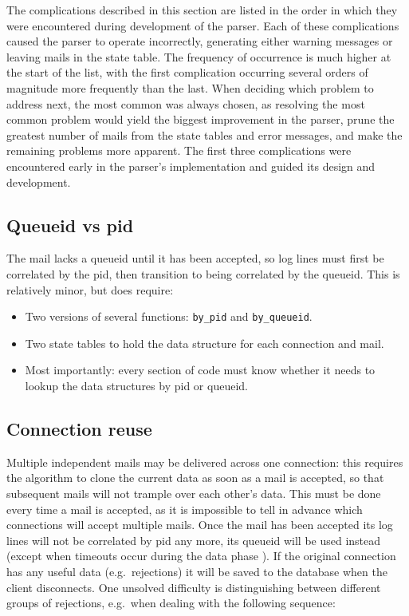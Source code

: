 The complications described in this section are listed in the order in
which they were encountered during development of the parser.  Each of
these complications caused the parser to operate incorrectly, generating
either warning messages or leaving mails in the state table.  The frequency
of occurrence is much higher at the start of the list, with the first
complication occurring several orders of magnitude more frequently than the
last.  When deciding which problem to address next, the most common was
always chosen, as resolving the most common problem would yield the biggest
improvement in the parser, prune the greatest number of mails from the
state tables and error messages, and make the remaining problems more
apparent.  The first three complications were encountered early in the
parser's implementation and guided its design and development.

\subsection{Queueid vs pid}

The mail lacks a queueid until it has been accepted, so log lines must
first be correlated by the  \gls{pid}, then transition to
being correlated by the queueid.  This is relatively minor, but does
require:

\begin{itemize}

    \item Two versions of several functions: \texttt{by\_pid} and
        \texttt{by\_queueid}.

    \item Two state tables to hold the data structure for each connection
        and mail.

    \item Most importantly: every section of code must know whether it
        needs to lookup the data structures by \gls{pid} or queueid.

\end{itemize}

\subsection{Connection reuse}

\label{connection reuse}

Multiple independent mails may be delivered across one connection: this
requires the algorithm to clone the current data as soon as a mail is
accepted, so that subsequent mails will not trample over each other's data.
This must be done every time a mail is accepted, as it is impossible to
tell in advance which connections will accept multiple mails.  Once the
mail has been accepted its log lines will not be correlated by \gls{pid}
any more, its queueid will be used instead (except when timeouts occur
during the data phase ).  If the
original connection has any useful data (e.g.\ rejections) it will be saved
to the database when the client disconnects.  One unsolved difficulty is
distinguishing between different groups of rejections, e.g.\ when dealing
with the following sequence:

